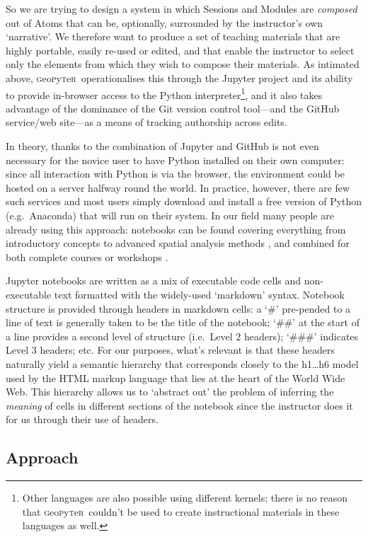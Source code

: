 \documentclass[letter, 11pt,titlepage]{article}
\newcommand{\gp}{\textsc{g}eo\textsc{p}y\textsc{t}e\textsc{r}~\/}
\newcommand{\eg}{e.g.~\/}
\newcommand{\ie}{i.e.~\/}
\begin{document}
So we are trying to design a system in which Sessions and Modules are \emph{composed} out of Atoms that can be, optionally, surrounded by the instructor's own `narrative'. We therefore want to produce a set of teaching materials that are highly portable, easily re-used or edited, and that enable the instructor to select only the elements from which they wish to compose their materials. As intimated above, \gp operationalises this through the Jupyter project and its ability to provide in-browser access to the Python interpreter\footnote{Other languages are also possible using different kernels; there is no reason that \gp couldn't be used to create instructional materials in these languages as well.}, and it also takes advantage of the dominance of the Git version control tool---and the GitHub service/web site---as a means of tracking authorship across edits.

In theory, thanks to the combination of Jupyter and GitHub is not even necessary
for the novice user to have Python installed on their own computer: since all
interaction with Python is via the browser, the environment could be hosted on a
server halfway round the world. In practice, however, there are few such
services and most users simply download and install a free version of Python
(\eg Anaconda) that will run on their system. In our field many people are
already using this approach: notebooks can be found covering everything from
introductory concepts \citep{millington_reades_2017_code} to advanced spatial
analysis methods \citep{darribas_gds15}, and combined for both complete courses
or workshops \citep{rey_2016_narsc}.

Jupyter notebooks are written as a mix of executable code cells and non-executable text formatted with the widely-used `markdown' syntax. Notebook structure is provided through headers in markdown cells: a `\#' pre-pended to a line of text is generally taken to be the title of the notebook; `\#\#' at the start of a line provides a second level of structure (\ie Level 2 headers); `\#\#\#' indicates Level 3 headers; etc. For our purposes, what's relevant is that these headers naturally yield a semantic hierarchy that corresponds closely to the h1\ldots{}h6 model used by the HTML markup language that lies at the heart of the World Wide Web. This hierarchy allows us to `abstract out' the problem of inferring the \emph{meaning} of cells in different sections of the notebook since the instructor does it for us through their use of headers.

\subsection{Approach}
\end{document}

